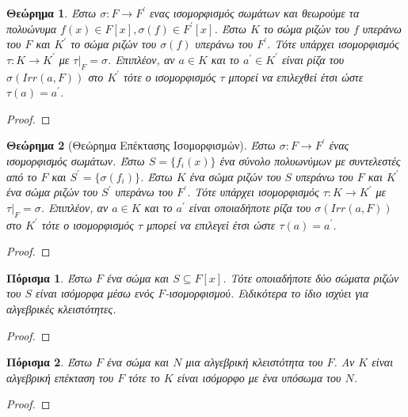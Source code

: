 \documentclass[oneside,a4paper]{article}
\newtheorem{theorem}{Θεώρημα}
\newtheorem{cor}{Πόρισμα}
\begin{document}
\begin{theorem} %
	Έστω $\sigma : F \rightarrow F^{\prime}$ ενας ισομορφισμός σωμάτων και θεωρούμε τα πολυώνυμα $f(x) \in F[x] , \sigma(f) \in F^{\prime}[x]$. Έστω $K$ το σώμα ριζών του $f$ υπεράνω του $F$ και $K^{\prime}$ το σώμα ριζών του $\sigma (f)$ υπεράνω του $F^{\prime}$. Τότε υπάρχει ισομορφισμός $\tau: K \rightarrow K^{\prime}$ με $\tau|_F = \sigma$. Επιπλέον, αν $a \in K$ και το $a^{\prime} \in K^{\prime}$ είναι ρίζα του $\sigma (Irr(a,F))$ στο $K^{\prime}$ τότε ο ισομορφισμός $\tau$ μπορεί να επιλεχθεί έτσι ώστε $\tau(a) = a^{\prime}$. 
\end{theorem}

\begin{proof}
\end{proof}


\begin{theorem} [Θεώρημα Επέκτασης Ισομορφισμών]
	Έστω $\sigma : F \rightarrow F^{\prime}$ ένας ισομορφισμός σωμάτων. Έστω $S = \{f_i (x)\}$ ένα σύνολο πολυωνύμων με συντελεστές από το $F$ και $S^{\prime} = \{\sigma (f_i)\}$. Έστω $K$ ένα σώμα ριζών του $S$ υπεράνω του $F$ και $K^{\prime}$ ένα σώμα ριζών του $S^{\prime}$ υπεράνω του $F^{\prime}$. Τότε υπάρχει ισομορφισμός $\tau : K \rightarrow K^{\prime}$ με $\tau|_F = \sigma$. Επιπλέον, αν $a \in K$ και το $a^{\prime}$ είναι οποιαδήποτε ρίζα του $\sigma(Irr(a,F))$ στο $K^{\prime}$ τότε ο ισομορφισμός $\tau$ μπορεί να επιλεγεί έτσι ώστε $\tau(a) = a^{\prime}$.
\end{theorem}

\begin{proof}
\end{proof}

\begin{cor} Έστω $F$ ένα σώμα και $S\subseteq F[x]$. Τότε οποιαδήποτε δύο σώματα ριζών του $S$ είναι ισόμορφα μέσω ενός $F$-ισομορφισμού. Ειδικότερα το ίδιο ισχύει για αλγεβρικές κλειστότητες.
\end{cor}

\begin{proof}
\end{proof}

\begin{cor}Έστω $F$ ένα σώμα και $N$ μια αλγεβρική κλειστότητα του $F$. Αν $K$ είναι αλγεβρική επέκταση του $F$ τότε το $K$ είναι ισόμορφο με ένα υπόσωμα του $N$.
\end{cor}


\begin{proof}
\end{proof}
\end{document}

